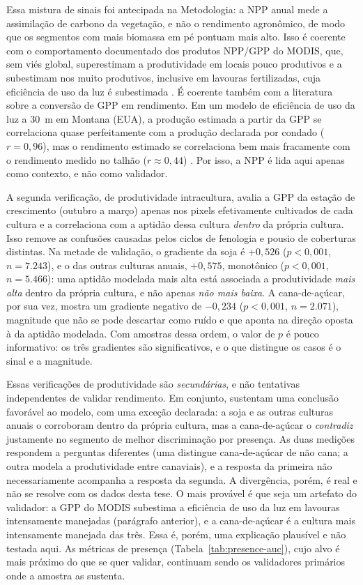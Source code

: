 Essa mistura de sinais foi antecipada na Metodologia: a NPP anual mede a assimilação de carbono da
vegetação, e não o rendimento agronômico, de modo que os segmentos com mais biomassa em pé pontuam
mais alto. Isso é coerente com o comportamento documentado dos produtos NPP/GPP do MODIS, que, sem
viés global, superestimam a produtividade em locais pouco produtivos e a subestimam nos muito
produtivos, inclusive em lavouras fertilizadas, cuja eficiência de uso da luz é subestimada
\citep[pp.~286, 288--289]{turner_evaluation_2006}. É coerente também com a literatura sobre a conversão
de GPP em rendimento. Em um modelo de eficiência de uso da luz a 30~m em Montana (EUA), a produção
estimada a partir da GPP se correlaciona quase perfeitamente com a produção declarada por condado
($r = 0{,}96$), mas o rendimento estimado se correlaciona bem mais fracamente com o rendimento medido
no talhão ($r \approx 0{,}44$) \citep[p.~16]{he_regional_2018}. Por isso, a NPP é lida aqui apenas
como contexto, e não como validador.

A segunda verificação, de produtividade intracultura, avalia a GPP da estação de crescimento (outubro a março)
apenas nos pixels efetivamente cultivados de cada cultura e a correlaciona com a aptidão dessa cultura
\emph{dentro} da própria cultura. Isso remove as confusões causadas pelos ciclos de fenologia e pousio
de coberturas distintas. Na metade de validação, o gradiente da soja é $+0,526$
($p < 0{,}001$, $n = 7.243$), e o das outras culturas anuais, $+0,575$, monotônico
($p < 0{,}001$, $n = 5.466$): uma aptidão modelada mais alta está associada a produtividade
\emph{mais alta} dentro da própria cultura, e não apenas \emph{não mais baixa}. A cana-de-açúcar, por
sua vez, mostra um gradiente negativo de $-0{,}234$ ($p < 0{,}001$, $n = 2.071$), magnitude que não
se pode descartar como ruído e que aponta na direção oposta à da aptidão modelada. Com amostras dessa
ordem, o valor de $p$ é pouco informativo: os três gradientes são significativos, e o que distingue
os casos é o sinal e a magnitude.

Essas verificações de produtividade são \emph{secundárias}, e não tentativas independentes de
validar rendimento. Em conjunto, sustentam uma conclusão favorável ao modelo, com uma exceção
declarada: a soja e as outras culturas anuais o corroboram dentro da própria cultura, mas a
cana-de-açúcar o \emph{contradiz} justamente no segmento de melhor discriminação por presença.
As duas medições respondem a perguntas diferentes (uma distingue cana-de-açúcar de não cana; a outra
modela a produtividade entre canaviais), e a resposta da primeira não necessariamente acompanha a resposta da segunda. A
divergência, porém, é real e não se resolve com os dados desta tese. O mais provável é que seja um
artefato do validador: a GPP do MODIS subestima a eficiência de uso da luz em lavouras intensamente
manejadas (parágrafo anterior), e a cana-de-açúcar é a cultura mais intensamente manejada das três.
Essa é, porém, uma explicação plausível e não testada aqui. As métricas de presença
(Tabela~\ref{tab:presence-auc}), cujo alvo é mais próximo do que se quer validar, continuam sendo os
validadores primários onde a amostra as sustenta.

